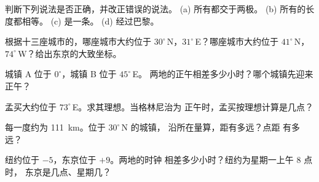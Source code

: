 \begin{exercise}[$\star$]\label{exo:g6:latitude-longitude:4}
判断下列说法是否正确，并改正错误的说法。
(a) 所有都交于两极。
(b) 所有的长度都相等。
(c) 是一条。
(d) 经过巴黎。
\end{exercise}

\begin{exercise}[$\star\star$]\label{exo:g6:latitude-longitude:5}
根据十三座城市的，哪座城市大约位于
$30^\circ$\,N，$31^\circ$\,E？哪座城市大约位于 $41^\circ$\,N，
$74^\circ$\,W？给出东京的大致坐标。
\end{exercise}

\begin{exercise}[$\star\star$]\label{exo:g6:latitude-longitude:6}
城镇 A 位于 $0^\circ$，城镇 B 位于 $45^\circ$\,E。
两地的正午相差多少小时？哪个城镇先迎来正午？
\end{exercise}

\begin{exercise}[$\star\star$]\label{exo:g6:latitude-longitude:7}
孟买大约位于 $73^\circ$\,E。求其理想。当格林尼治为
正午时，孟买按理想计算是几点？
\end{exercise}

\begin{exercise}[$\star\star$]\label{exo:g6:latitude-longitude:8}
每一度约为 \qty{111}{km}。位于 $30^\circ$\,N 的城镇，
沿所在量算，距有多远？点距
有多远？
\end{exercise}

\begin{exercise}[$\star\star$]\label{exo:g6:latitude-longitude:9}
纽约位于 $-5$，东京位于 $+9$。两地的时钟
相差多少小时？纽约为星期一上午 8 点时，
东京是几点、星期几？
\end{exercise}

